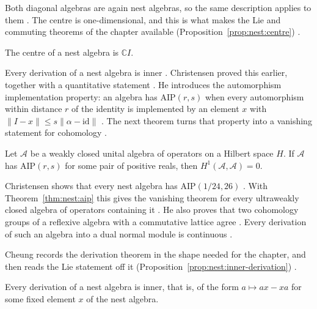 Both diagonal algebras are again nest algebras, so the same description applies to
them \cite[p.~308]{Cheung2003}. The centre is one-dimensional, and this is what
makes the Lie and commuting theorems of the chapter available (Proposition~\ref{prop:nest:centre})
\cite[Proposition~20, p.~309]{Cheung2003}.\begin{proposition}\label{prop:nest:centre}
The centre of a nest algebra is $\mathbb{C}I$.
\end{proposition}

Every derivation of a nest algebra is inner \cite[Proposition~21,
p.~309]{Cheung2003}. Christensen proved this earlier, together with a
quantitative statement \cite[Theorem~3.9, p.~160]{Christensen1977}. He
introduces the automorphism implementation property: an algebra has AIP$(r,s)$
when every automorphism within distance $r$ of the identity is implemented by
an element $x$ with $\|I-x\|\le s\|\alpha-\mathrm{id}\|$ \cite[Definition~3.1,
p.~158]{Christensen1977}. The next theorem turns that property into a
vanishing statement for cohomology \cite[Theorem~3.2,
p.~158]{Christensen1977}.

\begin{theorem}\label{thm:nest:aip}
Let $\mathcal{A}$ be a weakly closed unital algebra of operators on a Hilbert
space $H$. If $\mathcal{A}$ has AIP$(r,s)$ for some pair of positive reals, then
$H^1(\mathcal{A},\mathcal{A})=0$.
\end{theorem}

Christensen shows that every nest algebra has AIP$(1/24,26)$
\cite[Corollary~3.10, p.~161]{Christensen1977}. With
Theorem~\ref{thm:nest:aip} this gives the vanishing theorem for every
ultraweakly closed algebra of operators containing it \cite[Corollary~3.11,
p.~161]{Christensen1977}. He also proves that two cohomology groups of a
reflexive algebra with a commutative lattice agree \cite[Proposition~3.4,
p.~158]{Christensen1977}. Every derivation of such an algebra into a dual
normal module is continuous \cite[Corollary~2.3, p.~157]{Christensen1977}.

Cheung records the derivation theorem in the shape needed for the chapter, and
then reads the Lie statement off it (Proposition~\ref{prop:nest:inner-derivation})
\cite[Proposition~21, p.~309]{Cheung2003}.\begin{proposition}\label{prop:nest:inner-derivation}
Every derivation of a nest algebra is inner, that is, of the form
$a\mapsto ax-xa$ for some fixed element $x$ of the nest algebra.
\end{proposition}

